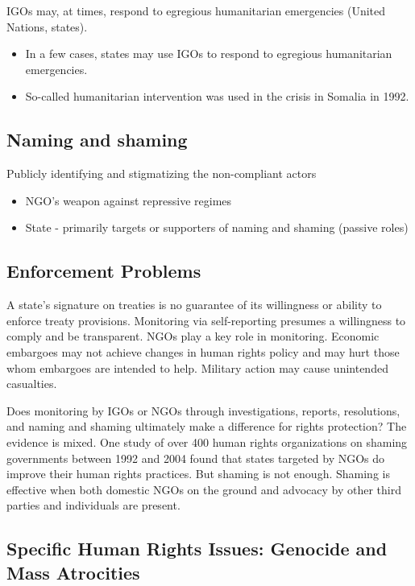 \documentclass[
]{book}
\begin{document}
IGOs may, at times, respond to egregious humanitarian emergencies (United Nations, states).

\begin{itemize}
\item
  In a few cases, states may use IGOs to respond to egregious humanitarian emergencies.
\item
  So-called humanitarian intervention was used in the crisis in Somalia in 1992.
\end{itemize}

\hypertarget{naming-and-shaming}{%
\subsection{Naming and shaming}\label{naming-and-shaming}}

Publicly identifying and stigmatizing the non-compliant actors

\begin{itemize}
\item
  NGO's weapon against repressive regimes
\item
  State - primarily targets or supporters of naming and shaming (passive roles)
\end{itemize}

\hypertarget{enforcement-problems}{%
\subsection{Enforcement Problems}\label{enforcement-problems}}

A state's signature on treaties is no guarantee of its willingness or ability to enforce treaty provisions. Monitoring via self-reporting presumes a willingness to comply and be transparent. NGOs play a key role in monitoring. Economic embargoes may not achieve changes in human rights policy and may hurt those whom embargoes are intended to help. Military action may cause unintended casualties.

Does monitoring by IGOs or NGOs through investigations, reports, resolutions, and naming and shaming ultimately make a difference for rights protection? The evidence is mixed. One study of over 400 human rights organizations on shaming governments between 1992 and 2004 found that states targeted by NGOs do improve their human rights practices. But shaming is not enough. Shaming is effective when both domestic NGOs on the ground and advocacy by other third parties and individuals are present.

\hypertarget{specific-human-rights-issues-genocide-and-mass-atrocities}{%
\subsection{Specific Human Rights Issues: Genocide and Mass Atrocities}\label{specific-human-rights-issues-genocide-and-mass-atrocities}}
\end{document}
